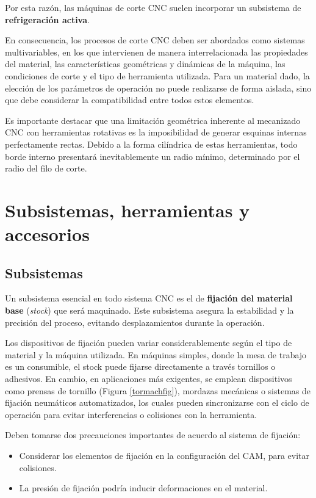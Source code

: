 Por esta razón, las máquinas de corte CNC suelen incorporar un subsistema de \textbf{refrigeración activa}. 

En consecuencia, los procesos de corte CNC deben ser abordados como sistemas multivariables, en los que intervienen de manera interrelacionada las propiedades del material, las características geométricas y dinámicas de la máquina, las condiciones de corte y el tipo de herramienta utilizada. Para un material dado, la elección de los parámetros de operación no puede realizarse de forma aislada, sino que debe considerar la compatibilidad entre todos estos elementos.

Es importante destacar que una limitación geométrica inherente al mecanizado CNC con herramientas rotativas es la imposibilidad de generar esquinas internas perfectamente rectas. Debido a la forma cilíndrica de estas herramientas, todo borde interno presentará inevitablemente un radio mínimo, determinado por el radio del filo de corte.

\section{Subsistemas, herramientas y accesorios}

\subsection{Subsistemas}

Un subsistema esencial en todo sistema CNC es el de \textbf{fijación del material base} (\textit{stock}) que será maquinado. Este subsistema asegura la estabilidad y la precisión del proceso, evitando desplazamientos durante la operación.

 Los dispositivos de fijación pueden variar considerablemente según el tipo de material y la máquina utilizada. En máquinas simples, donde la mesa de trabajo es un consumible, el stock puede fijarse directamente a través tornillos o adhesivos. En cambio, en aplicaciones más exigentes, se emplean dispositivos como prensas de tornillo (Figura \ref{tormachfig}), mordazas mecánicas o sistemas de fijación neumáticos automatizados, los cuales pueden sincronizarse con el ciclo de operación para evitar interferencias o colisiones con la herramienta.
 
 Deben tomarse dos precauciones importantes de acuerdo al sistema de fijación:
 
 \begin{itemize}
 	\item Considerar los elementos de fijación en la configuración del CAM, para evitar colisiones.
 	\item La presión de fijación podría inducir deformaciones en el material.
 \end{itemize}
 
